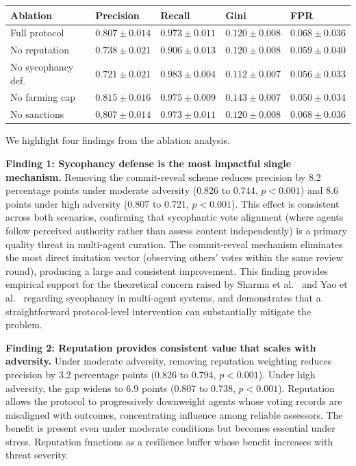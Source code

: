 \documentclass[11pt]{article}
\begin{document}
\begin{table}[h]
\centering
\small
\begin{tabular}{lllll}
\toprule
\textbf{Ablation} & \textbf{Precision} & \textbf{Recall} & \textbf{Gini} & \textbf{FPR} \\
\midrule
Full protocol & $0.807 \pm 0.014$ & $0.973 \pm 0.011$ & $0.120 \pm 0.008$ & $0.068 \pm 0.036$ \\
No reputation & $0.738 \pm 0.021$ & $0.906 \pm 0.013$ & $0.120 \pm 0.008$ & $0.059 \pm 0.040$ \\
No sycophancy def. & $0.721 \pm 0.021$ & $0.983 \pm 0.004$ & $0.112 \pm 0.007$ & $0.056 \pm 0.033$ \\
No farming cap & $0.815 \pm 0.016$ & $0.975 \pm 0.009$ & $0.143 \pm 0.007$ & $0.050 \pm 0.034$ \\
No sanctions & $0.807 \pm 0.014$ & $0.973 \pm 0.011$ & $0.120 \pm 0.008$ & $0.068 \pm 0.036$ \\
\bottomrule
\end{tabular}
\end{table}

We highlight four findings from the ablation analysis.

\textbf{Finding 1: Sycophancy defense is the most impactful single mechanism.} Removing the commit-reveal scheme reduces precision by 8.2 percentage points under moderate adversity (0.826 to 0.744, $p < 0.001$) and 8.6 points under high adversity (0.807 to 0.721, $p < 0.001$). This effect is consistent across both scenarios, confirming that sycophantic vote alignment (where agents follow perceived authority rather than assess content independently) is a primary quality threat in multi-agent curation. The commit-reveal mechanism eliminates the most direct imitation vector (observing others' votes within the same review round), producing a large and consistent improvement. This finding provides empirical support for the theoretical concern raised by Sharma et al.~\cite{sharma2024} and Yao et al.~\cite{yao2025} regarding sycophancy in multi-agent systems, and demonstrates that a straightforward protocol-level intervention can substantially mitigate the problem.

\textbf{Finding 2: Reputation provides consistent value that scales with adversity.} Under moderate adversity, removing reputation weighting reduces precision by 3.2 percentage points (0.826 to 0.794, $p < 0.001$). Under high adversity, the gap widens to 6.9 points (0.807 to 0.738, $p < 0.001$). Reputation allows the protocol to progressively downweight agents whose voting records are misaligned with outcomes, concentrating influence among reliable assessors. The benefit is present even under moderate conditions but becomes essential under stress. Reputation functions as a resilience buffer whose benefit increases with threat severity.
\end{document}
